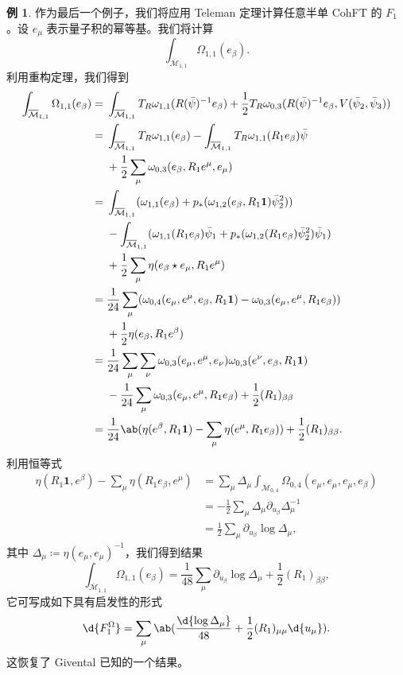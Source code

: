 \documentclass{amsart}
\theoremstyle{definition}
\newtheorem{exm}[thm]{例}
\theoremstyle{remark}
\theoremstyle{plain}
\theoremstyle{definition}
\theoremstyle{remark}
\newcommand{\Mbar}{\overline{\mathcal{M}}}
\newcommand{\1}{\mathbf{1}}
\newcommand{\2}{\mathbf{2}}
\newcommand{\3}{\mathbf{3}}
\begin{document}
\begin{exm}
    作为最后一个例子，我们将应用 Teleman 定理计算任意半单 CohFT 的 $F_1$。设 $e_{\mu}$ 表示量子积的幂等基。我们将计算
    \[ \int_{\Mbar_{1,1}} \Omega_{1,1}(e_{\beta}). \]
    利用重构定理，我们得到
    \begin{align*}
        \int_{\Mbar_{1,1}}\Omega_{1,1}(e_{\beta}) ={}& \int_{\Mbar_{1,1}} T_R \omega_{1,1}(R(\bar{\psi})^{-1} e_{\beta}) + \frac{1}{2} T_R \omega_{0,3}(R(\bar{\psi})^{-1} e_{\beta}, V(\bar{\psi}_2, \bar{\psi}_3)) \\
        ={}& \int_{\Mbar_{1,1}}T_R\omega_{1,1}(e_{\beta}) - \int_{\Mbar_{1,1}} T_R \omega_{1,1}(R_1 e_{\beta})\bar{\psi} \\ 
        &+ \frac{1}{2}\sum_{\mu}  \omega_{0,3}(e_{\beta}, R_1 e^{\mu}, e_{\mu}) \\
        ={}& \int_{\Mbar_{1,1}} ( \omega_{1,1}(e_{\beta}) + p_* ( \omega_{1,2}(e_{\beta}, R_1 \1) \bar{\psi}_2^2 )) \\
        &- \int_{\Mbar_{1,1}} (\omega_{1,1}(R_1 e_{\beta})\bar{\psi}_1 + p_* ( \omega_{1,2}(R_1 e_{\beta}) \bar{\psi}_2^2 ) \bar{\psi}_1) \\
        &+ \frac{1}{2} \sum_{\mu} \eta(e_{\beta} \star e_{\mu}, R_1 e^{\mu}) \\
        ={}& \frac{1}{24} \sum_{\mu} ( \omega_{0,4}(e_{\mu}, e^{\mu}, e_{\beta}, R_1 \1) -\omega_{0,3}(e_{\mu}, e^{\mu}, R_1 e_{\beta}) )\\
        &+ \frac{1}{2} \eta(e_{\beta}, R_1 e^{\beta}) \\
        ={}& \frac{1}{24} \sum_{\mu}\sum_{\nu} \omega_{0,3}(e_{\mu}, e^{\mu}, e_{\nu})\omega_{0,3}(e^{\nu}, e_{\beta}, R_1 \1) \\
        &-\frac{1}{24} \sum_{\mu} \omega_{0,3}(e_{\mu}, e^{\mu}, R_1 e_{\beta}) + \frac{1}{2} (R_1)_{\beta\beta} \\
        ={}& \frac{1}{24} \ab(\eta(e^{\beta}, R_1 \1) - \sum_{\mu} \eta(e^{\mu}, R_1 e_{\beta})) + \frac{1}{2} (R_1)_{\beta\beta}.
    \end{align*}
    利用恒等式
    \begin{align*}
        \eta(R_1 \1, e^{\beta}) - \sum_{\mu} \eta(R_1 e_{\beta}, e^{\mu}) &= \sum_{\mu} \Delta_{\mu} \int_{\Mbar_{0,4}} \Omega_{0,4}(e_{\mu}, e_{\mu}, e_{\mu}, e_{\beta}) \\
        &= -\frac{1}{2}\sum_{\mu} \Delta_{\mu} \partial_{u_{\beta}} \Delta_{\mu}^{-1} \\
        &= \frac{1}{2} \sum_{\mu} \partial_{u_{\beta}} \log \Delta_{\mu},
    \end{align*}
    其中 $\Delta_{\mu} \coloneqq \eta(e_{\mu}, e_{\mu})^{-1}$，我们得到结果
    \[ \int_{\Mbar_{1,1}} \Omega_{1,1}(e_{\beta}) = \frac{1}{48} \sum_{\mu} \partial_{u_{\beta}} \log \Delta_{\mu} + \frac{1}{2} (R_1)_{\beta\beta}, \]
    它可写成如下具有启发性的形式
    \[ \d{F_1^{\Omega}} = \sum_{\mu} \ab( \frac{\d{\log \Delta_{\mu}}}{48} + \frac{1}{2} (R_1)_{\mu\mu} \d{u_{\mu}} ). \]
    这恢复了 Givental 已知的一个结果。
\end{exm}
\end{document}
